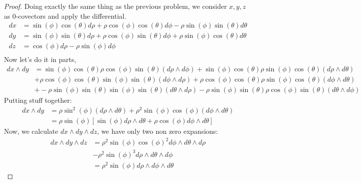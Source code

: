\begin{problem}
\end{problem}
\begin{proof}
Doing exactly the same thing as the previous problem, we consider $x,y,z$ as 0-covectors and apply the differential.
\begin{align*}
	dx & = \sin(\phi)\cos(\theta)d\rho + \rho\cos(\phi)\cos(\theta)d\phi - \rho\sin(\phi)\sin(\theta) d\theta \\
	dy & = \sin(\phi)\sin(\theta)d\rho + \rho\cos(\phi)\sin(\theta)d\phi + \rho\sin(\phi)\cos(\theta) d\theta \\
	dz & = \cos(\phi)d\rho - \rho\sin(\phi)d\phi                                                        \\
\end{align*}
Now let's do it in parts,
\begin{align*}
	dx \wedge dy &= \sin(\phi)\cos(\theta)\rho\cos(\phi)\sin(\theta) (d\rho \wedge d\phi) + \sin(\phi)\cos(\theta)\rho\sin(\phi)\cos(\theta) (d\rho \wedge d\theta)\\
	&+ \rho\cos(\phi)\cos(\theta)\sin(\phi)\sin(\theta)(d\phi \wedge d\rho) + \rho\cos(\phi)\cos(\theta)\rho\sin(\phi)\cos(\theta) (d\phi \wedge d\theta) \\
	&+ -\rho\sin(\phi)\sin(\theta)\sin(\phi)\sin(\theta)(d\theta \wedge d\rho) - \rho\sin(\phi)\sin(\theta)\rho\cos(\phi)\sin(\theta) (d\theta \wedge d\phi)
\end{align*}
Putting stuff together:
\begin{align*}
	dx\wedge dy &= \rho \sin^2(\phi)(d\rho \wedge d\theta) + \rho^2 \sin(\phi)\cos(\phi)(d\phi \wedge d\theta)\\
				&= \rho \sin(\phi) [\sin(\phi) d\rho \wedge d\theta + \rho\cos(\phi) d\phi \wedge d\theta]
\end{align*}
Now, we calculate $dx \wedge dy \wedge dz$, we have only two non zero expansions:
\begin{align*}
	dx \wedge dy \wedge dz &= \rho^2 \sin(\phi) \cos(\phi)^2 d\phi \wedge d\theta \wedge d\rho \\
							&- \rho^2 \sin(\phi)^3 d\rho \wedge d\theta \wedge d\phi\\
							&= \rho^2\sin(\phi) d\rho  \wedge d\phi \wedge d\theta
\end{align*}

\end{proof}

\begin{problem}
\end{problem}

